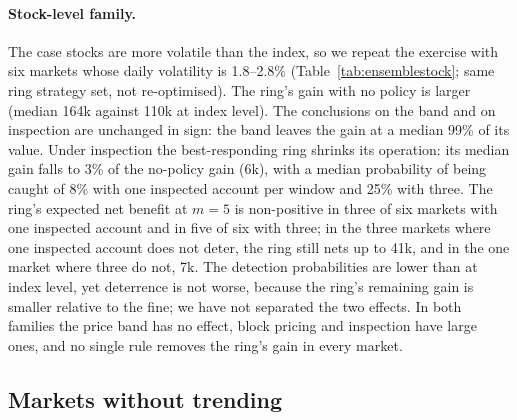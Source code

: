 \begin{table}[t]
\centering\footnotesize
{}
\caption{Index-level family of six calibrated markets: the best-responding ring's gain (tick-lots) against each policy, the median probability that a member is inspected in some window of an episode, and the number of markets in which the ring's expected net benefit is non-positive at a fine of five times the gain.}\label{tab:ensemble}
\end{table}

\paragraph{Stock-level family.} The case stocks are more volatile than the index, so we repeat the exercise with six markets whose daily volatility is 1.8--2.8\% (Table~\ref{tab:ensemblestock}; same ring strategy set, not re-optimised). The ring's gain with no policy is larger (median 164k against 110k at index level). The conclusions on the band and on inspection are unchanged in sign: the band leaves the gain at a median 99\% of its value. Under inspection the best-responding ring shrinks its operation: its median gain falls to 3\% of the no-policy gain (6k), with a median probability of being caught of 8\% with one inspected account per window and 25\% with three. The ring's expected net benefit at $m=5$ is non-positive in three of six markets with one inspected account and in five of six with three; in the three markets where one inspected account does not deter, the ring still nets up to 41k, and in the one market where three do not, 7k. The detection probabilities are lower than at index level, yet deterrence is not worse, because the ring's remaining gain is smaller relative to the fine; we have not separated the two effects. In both families the price band has no effect, block pricing and inspection have large ones, and no single rule removes the ring's gain in every market.

\begin{table}[t]
\centering\footnotesize
{}
\caption{Stock-level family of six calibrated markets (daily volatility 1.8--2.8\%): the ring's gain against each policy, as in Table~\ref{tab:ensemble}.}\label{tab:ensemblestock}
\end{table}

\subsection{Markets without trending}\label{sec:acf}

